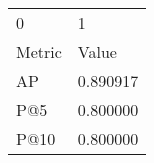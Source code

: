 \begin{tabular}{ll}
0 & 1 \\
Metric & Value \\
AP & 0.890917 \\
P@5 & 0.800000 \\
P@10 & 0.800000 \\
\end{tabular}
